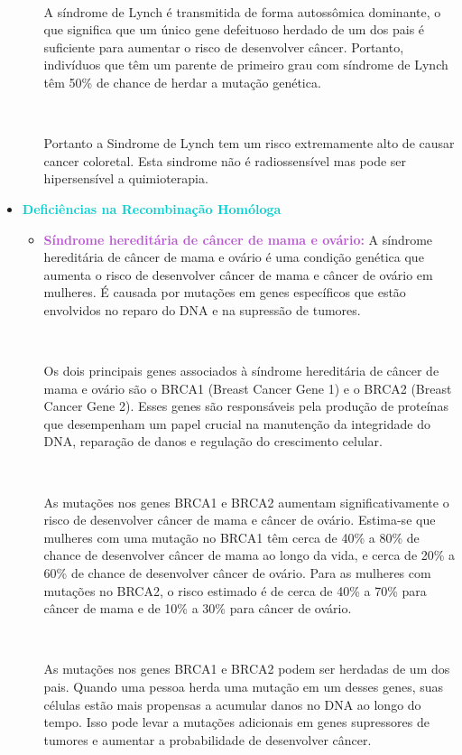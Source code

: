 \documentclass[11pt,a4paper]{article}
\begin{document}
\begin{itemize}[label=\textcolor{CarnationPink}{$\blacktriangleright$}]
\begin{itemize}[label=\textcolor{CarnationPink}{$\star$}]
			\

			A síndrome de Lynch é transmitida de forma autossômica dominante, o que significa que um único gene defeituoso herdado de um dos pais é suficiente para aumentar o risco de desenvolver câncer. Portanto, indivíduos que têm um parente de primeiro grau com síndrome de Lynch têm 50\% de chance de herdar a mutação genética.

			\

			Portanto a Sindrome de Lynch tem um risco extremamente alto de causar cancer coloretal. Esta sindrome não é radiossensível mas pode ser hipersensível a quimioterapia.

		\end{itemize}

		\item \textcolor{DarkTurquoise}{\LobsterTwo\Large\textbf{Deficiências na Recombinação Homóloga}}
		\begin{itemize}[label=\textcolor{CarnationPink}{$\star$}]
			\item \textcolor{MediumOrchid}{\large\textbf{Síndrome hereditária de câncer de mama e ovário:}} 
			A síndrome hereditária de câncer de mama e ovário é uma condição genética que aumenta o risco de desenvolver câncer de mama e câncer de ovário em mulheres. É causada por mutações em genes específicos que estão envolvidos no reparo do DNA e na supressão de tumores.

			\

			Os dois principais genes associados à síndrome hereditária de câncer de mama e ovário são o BRCA1 (Breast Cancer Gene 1) e o BRCA2 (Breast Cancer Gene 2). Esses genes são responsáveis pela produção de proteínas que desempenham um papel crucial na manutenção da integridade do DNA, reparação de danos e regulação do crescimento celular.

			\

			As mutações nos genes BRCA1 e BRCA2 aumentam significativamente o risco de desenvolver câncer de mama e câncer de ovário. Estima-se que mulheres com uma mutação no BRCA1 têm cerca de 40\% a 80\% de chance de desenvolver câncer de mama ao longo da vida, e cerca de 20\% a 60\% de chance de desenvolver câncer de ovário. Para as mulheres com mutações no BRCA2, o risco estimado é de cerca de 40\% a 70\% para câncer de mama e de 10\% a 30\% para câncer de ovário.

			\

			As mutações nos genes BRCA1 e BRCA2 podem ser herdadas de um dos pais. Quando uma pessoa herda uma mutação em um desses genes, suas células estão mais propensas a acumular danos no DNA ao longo do tempo. Isso pode levar a mutações adicionais em genes supressores de tumores e aumentar a probabilidade de desenvolver câncer.


\end{itemize}
\end{itemize}
\end{document}
